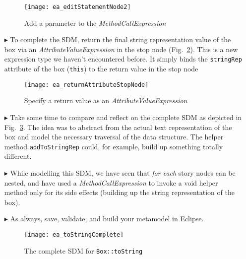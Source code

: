 \begin{itemize}
\begin{figure}[htbp]
\begin{center}
  \texttt{[image: ea\_editStatementNode2]}
  \caption{Add a parameter to the \emph{MethodCallExpression}}
  \label{ea:editStatement2}
\end{center}
\end{figure}

\item[$\blacktriangleright$] To complete the SDM, return the final string representation value of the box via an \emph{AttributeValueExpression} in
the stop node (Fig.~\ref{ea:toStringStopNode}). This is a new expression type we haven't encountered before. It simply
binds the \texttt{stringRep} attribute of the box (\texttt{this}) to the return value in the stop node


\begin{figure}[htbp]
\begin{center}
  \texttt{[image: ea\_returnAttributeStopNode]}
  \caption{Specify a return value as an \emph{AttributeValueExpression}}
  \label{ea:toStringStopNode}
\end{center}
\end{figure}

\vspace{0.5cm}

\item[$\blacktriangleright$] Take some time to compare and reflect on the complete SDM as depicted in Fig.~\ref{ea:sdm_tostringComplete}.  The idea was to
abstract from the actual text representation of the box and model the necessary traversal of the data structure. The helper method \texttt{addToStringRep}
could, for example, build up something totally different.

\vspace{0.5cm}

\item[$\blacktriangleright$] While modelling this SDM, we have seen that \emph{for each} story nodes can be nested, and have used a \emph{MethodCallExpression}
to invoke a void helper method only for its side effects (building up the string representation of the box).

\vspace{0.5cm}

\item[$\blacktriangleright$] As always, save, validate, and build your metamodel in Eclipse.

\begin{figure}[htbp]
\begin{center}
  \texttt{[image: ea\_toStringComplete]}
  \caption{The complete SDM for \texttt{Box::toString}}  
  \label{ea:sdm_tostringComplete}
\end{center}
\end{figure}
\FloatBarrier

\end{itemize}
